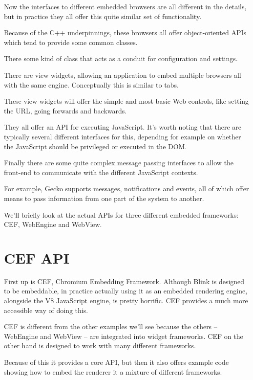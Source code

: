 \documentclass{article}
\begin{document}
Now the interfaces to different embedded browsers are all different in the details, but in practice they all offer this quite similar set of functionality.

Because of the C++ underpinnings, these browsers all offer object-oriented APIs which tend to provide some common classes.

There some kind of class that acts as a conduit for configuration and settings.

There are view widgets, allowing an application to embed multiple browsers all with the same engine. Conceptually this is similar to tabs.

These view widgets will offer the simple and most basic Web controls, like setting the URL, going forwards and backwards.

They all offer an API for executing JavaScript. It's worth noting that there are typically several different interfaces for this, depending for example on whether the JavaScript should be privileged or executed in the DOM.

Finally there are some quite complex message passing interfaces to allow the front-end to communicate with the different JavaScript contexts.

For example, Gecko supports messages, notifications and events, all of which offer means to pass information from one part of the system to another.

We'll briefly look at the actual APIs for three different embedded frameworks: CEF, WebEngine and WebView.


\section{CEF API}

First up is CEF, Chromium Embedding Framework. Although Blink is designed to be embeddable, in practice actually using it as an embedded rendering engine, alongside the V8 JavaScript engine, is pretty horrific. CEF provides a much more accessible way of doing this.

CEF is different from the other examples we'll see because the others -- WebEngine and WebView -- are integrated into widget frameworks. CEF on the other hand is designed to work with many different frameworks.

Because of this it provides a core API, but then it also offers example code showing how to embed the renderer it a mixture of different frameworks.
\end{document}
